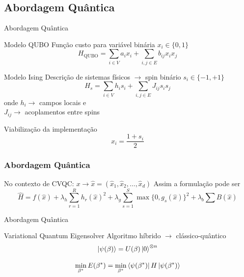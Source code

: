 \documentclass[xcolor={dvipsnames,table}]{beamer}
\begin{document}
\subsection{Abordagem Quântica}
\begin{frame}{Abordagem Quântica}
    \begin{minipage}[c]{0.45\textwidth}
        
        \begin{block}{Modelo QUBO}
            Função custo para variável binária $x_i\in\{0,1\}$
            $$
            H_{\text{QUBO}} = \sum_{i\in V}a_ix_i + \sum_{i,j\in E}b_{ij}x_ix_j
            $$
        \end{block}
        
        \begin{block}{Modelo Ising}
            Descrição de sistemas físicos $\rightarrow$ spin binário $s_i\in\{-1,+1\}$
            $$
            H_{s} = \sum_{i\in V}h_is_i + \sum_{i,j\in E}J_{ij}s_is_j
            $$
            onde $h_i \rightarrow$ campos locais e\\ $J_{ij}\rightarrow$ acoplamentos entre spins
        \end{block}
    \end{minipage}
    \hfill
    \begin{minipage}[c]{0.45\textwidth}
        \begin{block}{Viabilização da implementação}
            $$x_i=\frac{1+s_i}{2}$$
        \end{block}
    \end{minipage}
\end{frame}


\begin{frame}
    \frametitle{Abordagem Quântica}
    No contexto de CVQC: $x\rightarrow\hat{x}=(\hat{x}_1,\hat{x}_2,\dots,\hat{x}_d)$ 
    Assim a formulação pode ser 
    $$
    \hat{H}=f(\hat{x})+\lambda_h\sum_{r=1}^Rh_r(\hat{x})^2+\lambda_g\sum_{s=1}^S\max\{0,g_s(\hat{x})\}^2+\lambda_b\sum B(\hat{x})
    $$
\end{frame}

\begin{frame}{Abordagem Quântica}

    \begin{block}{Variational Quantum Eigensolver}
        Algoritmo híbrido $\rightarrow$ clássico-quântico 
        $$
            \ket{\psi(\beta)}=U(\beta)\ket{0}^{\otimes n}
        $$

        $$
            \min_{\beta^*} E(\beta^*) =\min_{\beta^*}\bra{\psi(\beta^*)}H\ket{\psi(\beta^*)}
        $$

    \end{block}

\end{frame}
\end{document}
